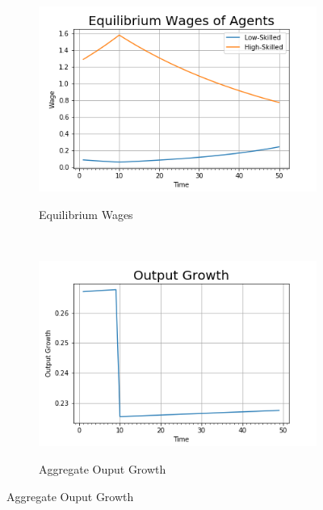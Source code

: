\documentclass[11pt]{article}
\begin{document}
\begin{figure}[H]
      \begin{subfigure}[b]{0.5\textwidth}
        \centering
        \caption{Equilibrium Wages}
        \includegraphics[width=\textwidth]{wage_agents_tax}
        \label{fig:tax_wage}
      \end{subfigure}%
      ~
      \begin{subfigure}[b]{0.5\textwidth}
        \centering
        \caption{Aggregate Ouput Growth}
        \includegraphics[width=\textwidth]{output_growth_tax}
        \label{fig:tax_growth}
      \end{subfigure}


\end{figure}
\end{document}
